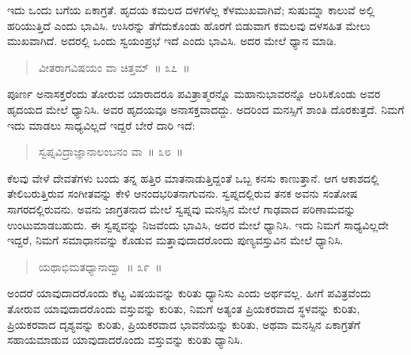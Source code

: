 
ಇದು ಒಂದು ಬಗೆಯ ಏಕಾಗ್ರತೆ. ಹೃದಯ ಕಮಲದ ದಳಗಳೆಲ್ಲ ಕೆಳಮುಖವಾಗಿವೆ; ಸುಷುಮ್ನಾ ಕಾಲುವೆ ಅಲ್ಲಿ ಹರಿಯುತ್ತಿದೆ ಎಂದು ಭಾವಿಸಿ. ಉಸಿರನ್ನು ತೆಗೆದುಕೊಂಡು ಹೊರಗೆ ಬಿಡುವಾಗ ಕಮಲವು ದಳಸಹಿತ ಮೇಲು ಮುಖವಾಗಿದೆ. ಅದರಲ್ಲಿ ಒಂದು ಸ್ವಯಂಪ್ರಭೆ ಇದೆ ಎಂದು ಭಾವಿಸಿ. ಅದರ ಮೇಲೆ ಧ್ಯಾನ ಮಾಡಿ. 

\vspace{-0.2cm}

\begin{verse}
ವೀತರಾಗವಿಷಯಂ ವಾ ಚಿತ್ತಮ್​~॥ ೩೭~॥
\end{verse}

\vspace{-0.3cm}


ಪೂರ್ಣ ಅನಾಸಕ್ತರೆಂದು ತೋರುವ ಯಾರಾದರೂ ಪವಿತ್ರಾತ್ಮರನ್ನೊ ಮಹಾನುಭಾವರನ್ನೊ ಆರಿಸಿಕೊಂಡು ಅವರ ಹೃದಯದ ಮೇಲೆ ಧ್ಯಾನಿಸಿ. ಅವರ ಹೃದಯವೂ ಅನಾಸಕ್ತವಾದದ್ದು. ಅದರಿಂದ ಮನಸ್ಸಿಗೆ ಶಾಂತಿ ದೊರಕುತ್ತದೆ. ನಿಮಗೆ ಇದು ಮಾಡಲು ಸಾಧ್ಯವಿಲ್ಲದೆ ಇದ್ದರೆ ಬೇರೆ ದಾರಿ ಇದೆ:

\vspace{-0.25cm}

\begin{verse}
ಸ್ವಪ್ನವಿದ್ರಾಜ್ಞಾನಾಲಂಬನಂ ವಾ~॥ ೩೮~॥
\end{verse}

\vspace{-0.2cm}


ಕೆಲವು ವೇಳೆ ದೇವತೆಗಳು ಬಂದು ತನ್ನ ಹತ್ತಿರ ಮಾತನಾಡುತ್ತಿದ್ದಂತೆ ಒಬ್ಬ ಕನಸು ಕಾಣುತ್ತಾನೆ. ಆಗ ಆಕಾಶದಲ್ಲಿ ತೇಲಿಬರುತ್ತಿರುವ ಸಂಗೀತವನ್ನು ಕೇಳಿ ಆನಂದಭರಿತನಾಗುವನು. ಸ್ವಪ್ನದಲ್ಲಿರುವ ತನಕ ಅವನು ಸಂತೋಷ ಸಾಗರದಲ್ಲಿರುವನು. ಅವನು ಜಾಗ್ರತನಾದ ಮೇಲೆ ಸ್ವಪ್ನವು ಮನಸ್ಸಿನ ಮೇಲೆ ಗಾಢವಾದ ಪರಿಣಾಮವನ್ನು ಉಂಟುಮಾಡಬಹುದು. ಈ ಸ್ವಪ್ನವನ್ನು ನಿಜವೆಂದು ಭಾವಿಸಿ, ಅದರ ಮೇಲೆ ಧ್ಯಾನಿಸಿ. ಇದು ನಿಮಗೆ ಸಾಧ್ಯವಿಲ್ಲದೇ ಇದ್ದರೆ, ನಿಮಗೆ ಸಮಾಧಾನವನ್ನು ಕೊಡುವ ಮತ್ತಾವುದಾದರೊಂದು ಪುಣ್ಯವಸ್ತುವಿನ ಮೇಲೆ ಧ್ಯಾನಿಸಿ. 

\vspace{-0.29cm}

\begin{verse}
ಯಥಾಭಿಮತಧ್ಯಾನಾದ್ವಾ~॥ ೩೯~॥
\end{verse}

\vspace{-0.3cm}


ಅಂದರೆ ಯಾವುದಾದರೊಂದು ಕೆಟ್ಟ ವಿಷಯವನ್ನು ಕುರಿತು ಧ್ಯಾನಿಸು ಎಂದು ಅರ್ಥವಲ್ಲ. ಹೀಗೆ ಪವಿತ್ರವೆಂದು ತೋರುವ ಯಾವುದಾದರೊಂದು ವಸ್ತುವನ್ನು ಕುರಿತು, ನಿಮಗೆ ಅತ್ಯಂತ ಪ್ರಿಯಕರವಾದ ಸ್ಥಳವನ್ನು ಕುರಿತು, ಪ್ರಿಯಕರವಾದ ದೃಶ್ಯವನ್ನು ಕುರಿತು, ಪ್ರಿಯಕರವಾದ ಭಾವನೆಯನ್ನು ಕುರಿತು, ಅಥವಾ ಮನಸ್ಸಿನ ಏಕಾಗ್ರತೆಗೆ ಸಹಾಯಮಾಡುವ ಯಾವುದಾದರೊಂದು ವಸ್ತುವನ್ನು ಕುರಿತು ಧ್ಯಾನಿಸಿ. 

